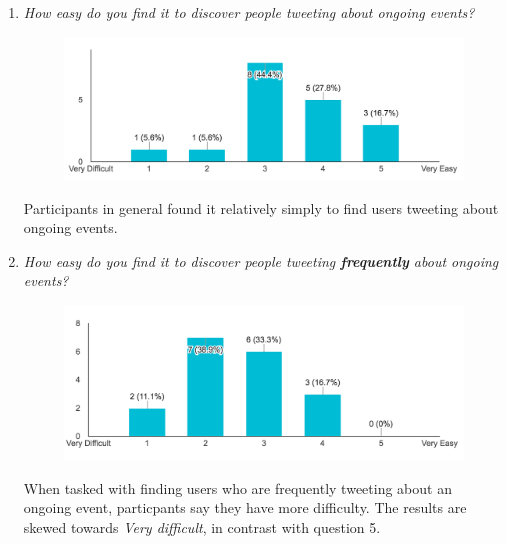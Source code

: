 \documentclass{l4proj}
\begin{document}
\begin{enumerate}
\item \textit{How easy do you find it to discover people tweeting about ongoing events?}
\par
\begin{figure}[H]
\centering
\includegraphics[scale=0.7]{findingusers.png}
\label{findingusers}
\end{figure}
Participants in general found it relatively simply to find users tweeting about ongoing events.


\item \textit{How easy do you find it to discover people tweeting \textbf{frequently} about ongoing events?}
\par
\begin{figure}[H]
\centering
\includegraphics[scale=0.7]{findingusersfreq.png}
\label{findingusersfreq}
\end{figure}
When tasked with finding users who are frequently tweeting about an ongoing event, particpants say they have more difficulty. The results are skewed towards \textit{Very difficult}, in contrast with question 5.


\end{enumerate}
\end{document}
